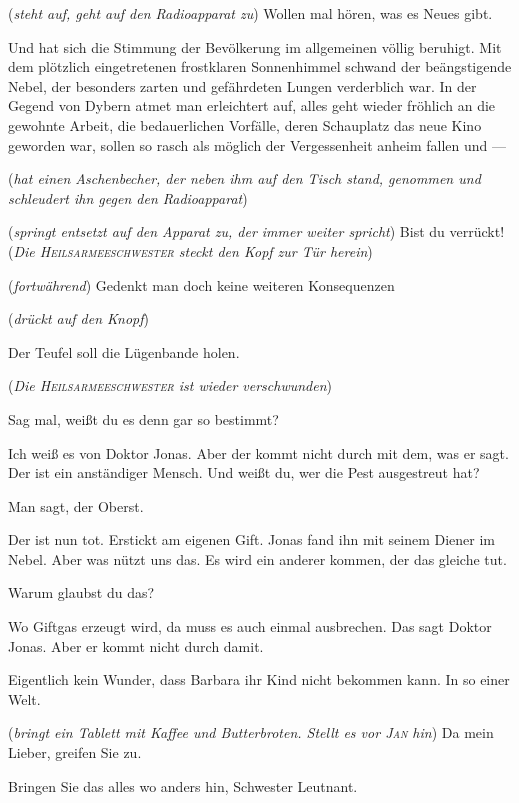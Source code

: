 \documentclass[
	final,
	a4paper,
	ngerman,
	mpinclude = true, %
	twoside = true,
	open = right,
	cleardoublepage = plain,
	DIV = 13,
	BCOR = 1cm,
	titlepage = firstiscover,
	]{scrbook}
\newcommand{\direction}[1]{(\textit{#1})}
\newcommand{\thecharacter}[1]{\textup{\textsc{#1}}\xspace}
\newcommand{\theJosef}{\thecharacter{Josef}}
\newcommand{\theJan}{\thecharacter{Jan}}
\newcommand{\theHeilsarmeeschwester}{\thecharacter{Heilsarmeeschwester}}
\newcommand{\character}[1]{\item[#1]}
\newcommand{\Josef}{\character{\theJosef}}
\newcommand{\Jan}{\character{\theJan}}
\newcommand{\Heilsarmeeschwester}{\character{Schwester}}
\begin{document}
\begin{play}
\Josef
\direction{steht auf, geht auf den Radioapparat zu} Wollen mal hören, was es Neues gibt.

\character{Radio}
Und hat sich die Stimmung der Bevölkerung im allgemeinen völlig beruhigt. Mit dem plötzlich eingetretenen frostklaren Sonnenhimmel schwand der beängstigende Nebel, der besonders zarten und gefährdeten Lungen verderblich war. In der Gegend von Dybern atmet man erleichtert auf, alles geht wieder fröhlich an die gewohnte Arbeit, die bedauerlichen Vorfälle, deren Schauplatz das neue Kino geworden war, sollen so rasch als möglich der Vergessenheit anheim fallen und ---

\Jan
\direction{hat einen Aschenbecher, der neben ihm auf den Tisch stand, genommen und schleudert ihn gegen den Radioapparat}

\Josef
\direction{springt entsetzt auf den Apparat zu, der immer weiter spricht} Bist du verrückt!\direction{Die \theHeilsarmeeschwester steckt den Kopf zur Tür herein}

\character{Radio}
\direction{fortwährend} Gedenkt man doch keine weiteren Konsequenzen

\Josef
\direction{drückt auf den Knopf}

\Jan
Der Teufel soll die Lügenbande holen.

\direction{Die \theHeilsarmeeschwester ist wieder verschwunden}

\Josef
Sag mal, weißt du es denn gar so bestimmt?

\Jan
Ich weiß es von Doktor Jonas. Aber der kommt nicht durch mit dem, was er sagt. Der ist ein anständiger Mensch. Und weißt du, wer die Pest ausgestreut hat?

\Josef
Man sagt, der Oberst.

\Jan
Der ist nun tot. Erstickt am eigenen Gift. Jonas fand ihn mit seinem Diener im Nebel. Aber was nützt uns das. Es wird ein anderer kommen, der das gleiche tut.

\Josef
Warum glaubst du das?

\Jan
Wo Giftgas erzeugt wird, da muss es auch einmal ausbrechen. Das sagt Doktor Jonas. Aber er kommt nicht durch damit.

\Josef
Eigentlich kein Wunder, dass Barbara ihr Kind nicht bekommen kann. In so einer Welt.

\Heilsarmeeschwester
\direction{bringt ein Tablett mit Kaffee und Butterbroten. Stellt es vor \theJan hin} Da mein Lieber, greifen Sie zu.

\Jan
Bringen Sie das alles wo anders hin, Schwester Leutnant.


\end{play}
\end{document}

